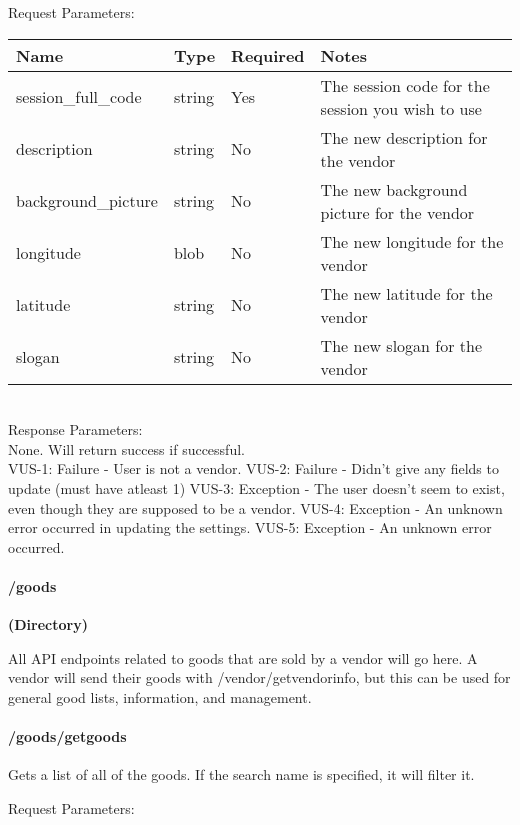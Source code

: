 \documentclass{article}[11pt]
\begin{document}
\noindent
Request Parameters:

\noindent
\begin{tabular}{|l|l|l|l|}
\hline
\textbf{Name} & \textbf{Type} & \textbf{Required} & \textbf{Notes} \\
\hline
session\_full\_code & string & Yes & The session code for the session you wish to use \\
description & string & No & The new description for the vendor \\
background\_picture & string & No & The new background picture for the vendor \\
longitude & blob & No & The new longitude for the vendor \\
latitude & string & No & The new latitude for the vendor \\
slogan & string & No & The new slogan for the vendor \\
\hline
\end{tabular} \\

\noindent
Response Parameters: \\
None. Will return success if successful. \\

\ErrorsSession
VUS-1: Failure - User is not a vendor.
VUS-2: Failure - Didn't give any fields to update (must have atleast 1)
VUS-3: Exception - The user doesn't seem to exist, even though they are supposed to be a vendor.
VUS-4: Exception - An unknown error occurred in updating the settings.
VUS-5: Exception - An unknown error occurred.



\newpage

\paragraph{/goods}\textbf{ (Directory) }

All API endpoints related to goods that are sold by a vendor will go here. A vendor will send their goods with /vendor/getvendorinfo, but this can be used for general good lists, information, and management.

\paragraph{/goods/getgoods}\textbf{}

Gets a list of all of the goods. If the search name is specified, it will filter it.

\noindent
Request Parameters:
\end{document}
